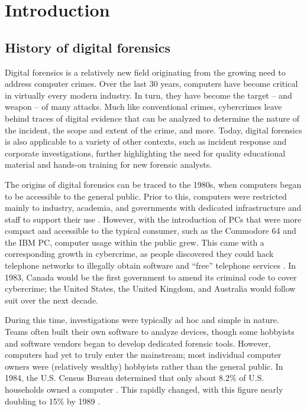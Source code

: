 \documentclass[letterpaper,12pt]{report}
\begin{document}
\newpage
{}
\setcounter{page}{1}
\linespread{2}

\chapter{Introduction}\label{chapter-one}

\section{History of digital
forensics}\label{history-of-digital-forensics}

Digital forensics is a relatively new field originating from the growing
need to address computer crimes. Over the last 30 years, computers have
become critical in virtually every modern industry. In turn, they have
become the target -- and weapon -- of many attacks. Much like
conventional crimes, cybercrimes leave behind traces of digital evidence
that can be analyzed to determine the nature of the incident, the scope
and extent of the crime, and more. Today, digital forensics is also
applicable to a variety of other contexts, such as incident response and
corporate investigations, further highlighting the need for quality
educational material and hands-on training for new forensic analysts.

The origins of digital forensics can be traced to the 1980s, when
computers began to be accessible to the general public. Prior to this,
computers were restricted mainly to industry, academia, and governments
with dedicated infrastructure and staff to support their use
\cite{pollittHistoryDigitalForensics2010}. However, with the
introduction of PCs that were more compact and accessible to the typical
consumer, such as the Commodore 64 and the IBM PC, computer usage within
the public grew. This came with a corresponding growth in cybercrime, as
people discovered they could hack telephone networks to illegally obtain
software and ``free'' telephone services
\cite{jonesInsightDigitalForensics2022}. In 1983, Canada would be
the first government to amend its criminal code to cover cybercrime; the
United States, the United Kingdom, and Australia would follow suit over
the next decade.

During this time, investigations were typically ad hoc and simple in
nature. Teams often built their own software to analyze devices, though
some hobbyists and software vendors began to develop dedicated forensic
tools. However, computers had yet to truly enter the mainstream; most
individual computer owners were (relatively wealthy) hobbyists rather
than the general public. In 1984, the U.S. Census Bureau determined that
only about 8.2\% of U.S. households owned a computer
\cite{robertkominskiComputerUseUnited1988}. This rapidly changed,
with this figure nearly doubling to 15\% by 1989
\cite{robertkominskiComputerUseUnited1991}.
\end{document}
